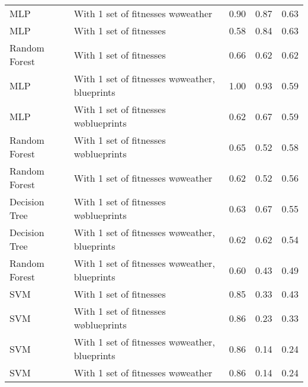 \begin{tabular}{llrrr}
           MLP &             With 1 set of fitnesses w\o weather &       0.90 &    0.87 & 0.63 \\
           MLP &                         With 1 set of fitnesses &       0.58 &    0.84 & 0.63 \\
 Random Forest &                         With 1 set of fitnesses &       0.66 &    0.62 & 0.62 \\
           MLP & With 1 set of fitnesses w\o weather, blueprints &       1.00 &    0.93 & 0.59 \\
           MLP &          With 1 set of fitnesses w\o blueprints &       0.62 &    0.67 & 0.59 \\
 Random Forest &          With 1 set of fitnesses w\o blueprints &       0.65 &    0.52 & 0.58 \\
 Random Forest &             With 1 set of fitnesses w\o weather &       0.62 &    0.52 & 0.56 \\
 Decision Tree &          With 1 set of fitnesses w\o blueprints &       0.63 &    0.67 & 0.55 \\
 Decision Tree & With 1 set of fitnesses w\o weather, blueprints &       0.62 &    0.62 & 0.54 \\
 Random Forest & With 1 set of fitnesses w\o weather, blueprints &       0.60 &    0.43 & 0.49 \\
           SVM &                         With 1 set of fitnesses &       0.85 &    0.33 & 0.43 \\
           SVM &          With 1 set of fitnesses w\o blueprints &       0.86 &    0.23 & 0.33 \\
           SVM & With 1 set of fitnesses w\o weather, blueprints &       0.86 &    0.14 & 0.24 \\
           SVM &             With 1 set of fitnesses w\o weather &       0.86 &    0.14 & 0.24 \\
\bottomrule
\end{tabular}
